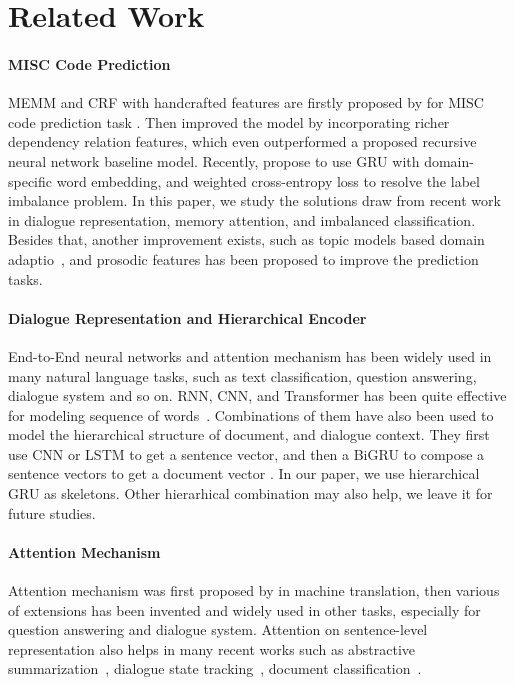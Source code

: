 \section{Related Work}

\paragraph{MISC Code Prediction} MEMM and CRF with handcrafted
features are firstly proposed by \citet{can2012case, can2015dialog}
for MISC code prediction task . Then \citet{tanana2015recursive}
improved the model by incorporating richer dependency relation
features, which even outperformed a proposed recursive neural network
baseline model. Recently, \cite{xiao2016behavioral} propose to use GRU
with domain-specific word embedding, and weighted cross-entropy loss
to resolve the label imbalance problem. In this paper, we study the
solutions draw from recent work in dialogue representation, memory
attention, and imbalanced classification. Besides that, another
improvement exists, such as topic models based domain
adaptio~\cite{atkins2014scaling, huang2018modeling}, and prosodic
features \cite{weber2002using} has been proposed to improve the
prediction tasks.

\paragraph{Dialogue Representation and Hierarchical Encoder }
End-to-End neural networks and attention mechanism has been widely
used in many natural language tasks, such as text classification,
question answering, dialogue system and so on.  RNN, CNN, and
Transformer has been quite effective for modeling sequence of
words~\cite{ kim14cnn,zhang2015character}. Combinations of them have
also been used to model the hierarchical structure of document, and
dialogue context. They first use CNN or LSTM to get a sentence vector,
and then a BiGRU to compose a sentence vectors to get a document
vector \cite{tang2015document, li2015hierarchical,
  yang2016hierarchical,sordoni2015hierarchical, serban2016building,
  serban2017multiresolution}. In our paper, we use hierarchical GRU as
skeletons. Other hierarhical combination may also help, we leave it
for future studies.

\paragraph{Attention Mechanism}
Attention mechanism was first proposed by \citet{bahdanau2014neural}
in machine translation, then various of extensions has been invented
and widely used in other tasks, especially for question answering and
dialogue
system\cite{matchlstm,bidaf,sukhbaatar15mnet,fei17gmnet,P18-1157}.
Attention on sentence-level representation also helps in many recent
works such as abstractive summarization~\cite{P18-1013}, dialogue
state tracking~\cite{zhou2018multi,zhou2016multi}, document
classification~\cite{yang2016hierarchical}.


